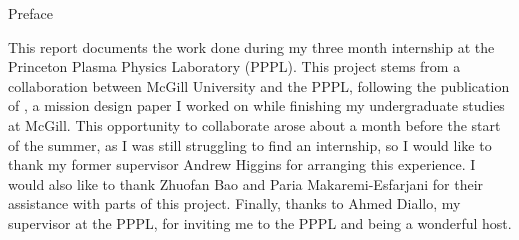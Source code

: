 


\begin{plainchp}{Preface}
    This report documents the work done during my three month internship at the Princeton Plasma Physics Laboratory (PPPL). This project stems from a collaboration between McGill University and the PPPL, following the publication of , a mission design paper I worked on while finishing my undergraduate studies at McGill. This opportunity to collaborate arose about a month before the start of the summer, as I was still struggling to find an internship, so I would like to thank my former supervisor Andrew Higgins for arranging this experience. I would also like to thank Zhuofan Bao and Paria Makaremi-Esfarjani for their assistance with parts of this project. Finally, thanks to Ahmed Diallo, my supervisor at the PPPL, for inviting me to the PPPL and being a wonderful host.
\end{plainchp}